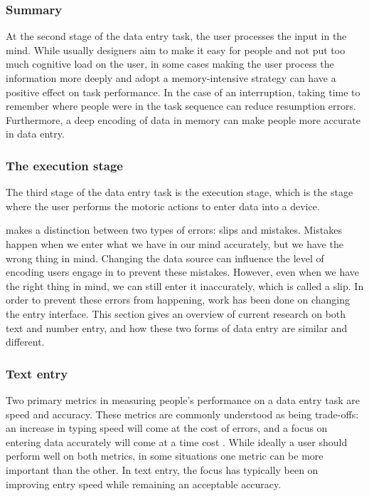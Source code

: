 \subsubsection{Summary}
At the second stage of the data entry task, the user processes the input in the mind. While usually designers aim to make it easy for people and not put too much cognitive load on the user, in some cases making the user process the information more deeply and adopt a memory-intensive strategy can have a positive effect on task performance. In the case of an interruption, taking time to remember where people were in the task sequence can reduce resumption errors. Furthermore, a deep encoding of data in memory can make people more accurate in data entry.

\subsubsection{The execution stage}
The third stage of the data entry task is the execution stage, which is the stage where the user performs the motoric actions to enter data into a device.

\citet{Reason1990} makes a distinction between two types of errors: slips and mistakes. Mistakes happen when we enter what we have in our mind accurately, but we have the wrong thing in mind. Changing the data source can influence the level of encoding users engage in to prevent these mistakes. However, even when we have the right thing in mind, we can still enter it inaccurately, which is called a slip. In order to prevent these errors from happening, work has been done on changing the entry interface. This section gives an overview of current research on both text and number entry, and how these two forms of data entry are similar and different.

\subsubsection{Text entry}
Two primary metrics in measuring people's performance on a data entry task are speed and accuracy. These metrics are commonly understood as being trade-offs: an increase in typing speed will come at the cost of errors, and a focus on entering data accurately will come at a time cost \citep{MacKenzie2002, Smith2008}.  While ideally a user should perform well on both metrics, in some situations one metric can be more important than the other. In text entry, the focus has typically been on improving entry speed while remaining an acceptable accuracy.

